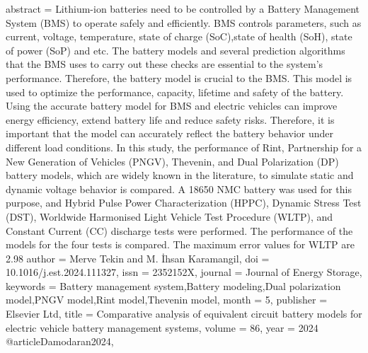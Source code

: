 {{{{{{{{{{   abstract = {Lithium-ion batteries need to be controlled by a Battery Management System (BMS) to operate safely and efficiently. BMS controls parameters, such as current, voltage, temperature, state of charge (SoC),state of health (SoH), state of power (SoP) and etc. The battery models and several prediction algorithms that the BMS uses to carry out these checks are essential to the system's performance. Therefore, the battery model is crucial to the BMS. This model is used to optimize the performance, capacity, lifetime and safety of the battery. Using the accurate battery model for BMS and electric vehicles can improve energy efficiency, extend battery life and reduce safety risks. Therefore, it is important that the model can accurately reflect the battery behavior under different load conditions. In this study, the performance of Rint, Partnership for a New Generation of Vehicles (PNGV), Thevenin, and Dual Polarization (DP) battery models, which are widely known in the literature, to simulate static and dynamic voltage behavior is compared. A 18650 NMC battery was used for this purpose, and Hybrid Pulse Power Characterization (HPPC), Dynamic Stress Test (DST), Worldwide Harmonised Light Vehicle Test Procedure (WLTP), and Constant Current (CC) discharge tests were performed. The performance of the models for the four tests is compared. The maximum error values for WLTP are 2.98 %
   author = {Merve Tekin and M. İhsan Karamangil},
   doi = {10.1016/j.est.2024.111327},
   issn = {2352152X},
   journal = {Journal of Energy Storage},
   keywords = {Battery management system,Battery modeling,Dual polarization model,PNGV model,Rint model,Thevenin model},
   month = {5},
   publisher = {Elsevier Ltd},
   title = {Comparative analysis of equivalent circuit battery models for electric vehicle battery management systems},
   volume = {86},
   year = {2024}
}
@article{Damodaran2024,
}}}}}}}}}}}
